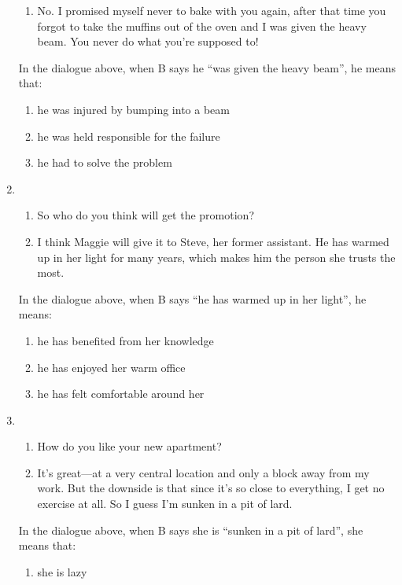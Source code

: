 \documentclass[output=paper]{langsci/langscibook}
\begin{document}
\begin{paperappendix}
\begin{enumerate}
\begin{enumerate}[nosep,label=\Alph*:]
        \item No. I promised myself never to bake with you again, after that time you forgot to take the muffins out of the oven and I was given the heavy beam. You never do what you're supposed to!
        \end{enumerate}
        In the dialogue above, when B says he \enquote{was given the heavy beam}, he means that:
        \begin{enumerate}[label=\arabic*.,noitemsep]
        \item he was injured by bumping into a beam
        \item he was held responsible for the failure
        \item he had to solve the problem
        \end{enumerate}
    \item
       \begin{enumerate}[nosep,label=\Alph*:]
        \item So who do you think will get the promotion?
        \item I think Maggie will give it to Steve, her former assistant. He has warmed up in her light for many years, which makes him the person she trusts the most.
        \end{enumerate}
        In the dialogue above, when B says \enquote{he has warmed up in her light}, he means:
        \begin{enumerate}[label=\arabic*.,noitemsep]
        \item he has benefited from her knowledge
        \item he has enjoyed her warm office
        \item he has felt comfortable around her
        \end{enumerate}
    \item
       \begin{enumerate}[nosep,label=\Alph*:]
        \item How do you like your new apartment?
        \item It's great—at a very central location and only a block away from my work. But the downside is that since it's so close to everything, I get no exercise at all. So I guess I’m sunken in a pit of lard.
        \end{enumerate}
        In the dialogue above, when B says she is \enquote{sunken in a pit of lard}, she means that:
        \begin{enumerate}[label=\arabic*.,noitemsep]
        \item she is lazy

\end{enumerate}
\end{enumerate}
\end{paperappendix}
\end{document}
